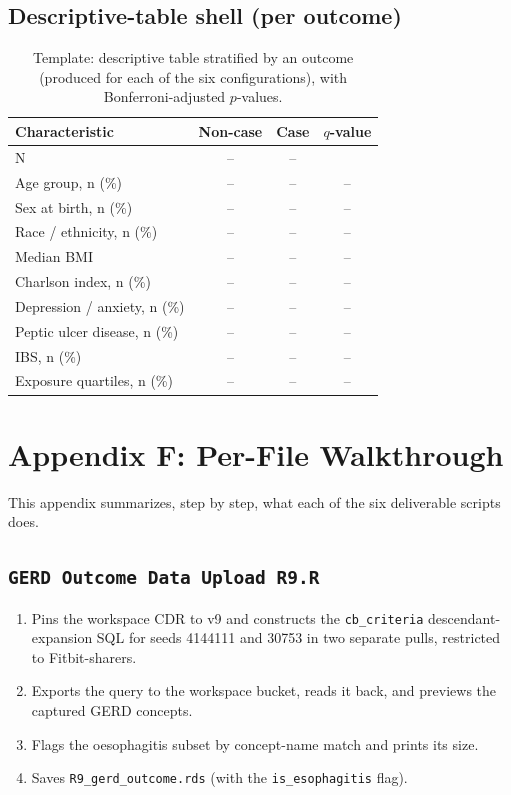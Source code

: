 \documentclass[11pt]{article}
\newcommand{\code}[1]{\texttt{\small #1}}
\begin{document}
\subsection{Descriptive-table shell (per outcome)}
\begin{table}[h]
\centering
\footnotesize
\begin{tabular}{@{}l ccc@{}}
\toprule
\textbf{Characteristic} & \textbf{Non-case} & \textbf{Case} & \textbf{$q$-value} \\
\midrule
N & -- & -- & \\
Age group, n (\%) & -- & -- & -- \\
Sex at birth, n (\%) & -- & -- & -- \\
Race / ethnicity, n (\%) & -- & -- & -- \\
Median BMI & -- & -- & -- \\
Charlson index, n (\%) & -- & -- & -- \\
Depression / anxiety, n (\%) & -- & -- & -- \\
Peptic ulcer disease, n (\%) & -- & -- & -- \\
IBS, n (\%) & -- & -- & -- \\
Exposure quartiles, n (\%) & -- & -- & -- \\
\bottomrule
\end{tabular}
\caption{Template: descriptive table stratified by an outcome (produced for each of the six
configurations), with Bonferroni-adjusted $p$-values.}
\end{table}

\section{Appendix F: Per-File Walkthrough}
This appendix summarizes, step by step, what each of the six deliverable scripts does.

\subsection{\code{GERD Outcome Data Upload R9.R}}
\begin{enumerate}[leftmargin=1.5em,itemsep=0pt]
  \item Pins the workspace CDR to v9 and constructs the \code{cb_criteria} descendant-expansion SQL for
  seeds 4144111 and 30753 in two separate pulls, restricted to Fitbit-sharers.
  \item Exports the query to the workspace bucket, reads it back, and previews the captured GERD
  concepts.
  \item Flags the oesophagitis subset by concept-name match and prints its size.
  \item Saves \code{R9_gerd_outcome.rds} (with the \code{is_esophagitis} flag).
\end{enumerate}
\end{document}
